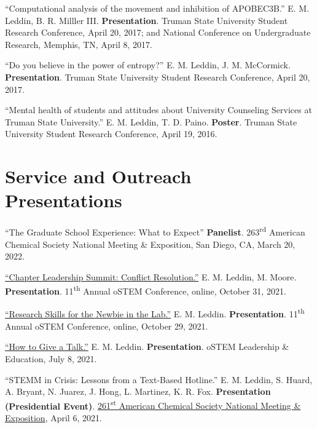 \documentclass[letterpaper,11pt]{article}
\begin{document}
\begin{etaremune}[start=17]
{  \item \textnormal{``Computational analysis of the movement and inhibition of APOBEC3B.'' E. M. Leddin, B. R. Milller III. \textbf{Presentation}. Truman State University Student Research Conference, April 20, 2017; and National Conference on Undergraduate Research, Memphis, TN, April 8, 2017.}
  \item \textnormal{``Do you believe in the power of entropy?'' E. M. Leddin, J. M. McCormick. \textbf{Presentation}. Truman State University Student Research Conference, April 20, 2017.}
  \item \textnormal{``Mental health of students and attitudes about University Counseling Services at Truman State University.'' E. M. Leddin, T. D. Paino. \textbf{Poster}. Truman State University Student Research Conference, April 19, 2016.}
  }
\end{etaremune}


%
%
%

\section{Service and Outreach Presentations}
\begin{etaremune}[start=19]
\small{
  \item \textnormal{``The Graduate School Experience: What to Expect'' \textbf{Panelist}. 263\textsuperscript{rd} American Chemical Society National Meeting \& Exposition, San Diego, CA, March 20, 2022.}
  \item \textnormal{\href{http://bit.ly/2021-oSTEM-CLS}{``Chapter Leadership Summit: Conflict Resolution.''} E. M. Leddin, M. Moore. \textbf{Presentation}. 11\textsuperscript{th} Annual oSTEM Conference, online, October 31, 2021.}
  \item \textnormal{\href{http://bit.ly/2021-oSTEM-RSNL}{``Research Skills for the Newbie in the Lab.''} E. M. Leddin. \textbf{Presentation}. 11\textsuperscript{th} Annual oSTEM Conference, online, October 29, 2021.}
  \item \textnormal{\href{https://bit.ly/2021-LE-Give-Talk
}{``How to Give a Talk.''} E. M. Leddin. \textbf{Presentation}. oSTEM Leadership \& Education, July 8, 2021.}
  \item \textnormal{``STEMM in Crisis: Lessons from a Text-Based Hotline.'' E. M. Leddin, S. Huard, A. Bryant, N. Juarez, J. Hong, L. Martinez, K. R. Fox. \textbf{Presentation (Presidential Event)}. \href{https://bit.ly/2021-THRIVE-ACS}{261\textsuperscript{st} American Chemical Society National Meeting \& Exposition}, April 6, 2021.}

  }
\end{etaremune}  
\end{document}
